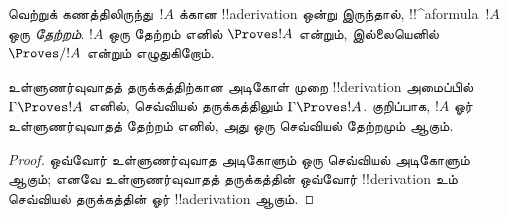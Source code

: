 \documentclass[../../../include/open-logic-section]{subfiles}
\begin{document}
\begin{defn}[தேற்றங்கள்]
வெற்றுக் கணத்திலிருந்து~$!A$ க்கான !!a{derivation} ஒன்று இருந்தால்,
!!^a{formula}~$!A$ ஒரு \emph{தேற்றம்}. $!A$ ஒரு தேற்றம் எனில் $\Proves !A$
என்றும், இல்லையெனில் $\Proves/ !A$ என்றும் எழுதுகிறோம்.
\end{defn}

\begin{prop}
  உள்ளுணர்வுவாதத் தருக்கத்திற்கான அடிகோள் முறை !!{derivation} அமைப்பில்
  $\Gamma \Proves !A$ எனில், செவ்வியல் தருக்கத்திலும் $\Gamma \Proves !A$.
  குறிப்பாக, $!A$ ஓர் உள்ளுணர்வுவாதத் தேற்றம் எனில், அது ஒரு செவ்வியல்
  தேற்றமும் ஆகும்.
\end{prop}

\begin{proof}
  ஒவ்வோர் உள்ளுணர்வுவாத அடிகோளும் ஒரு செவ்வியல் அடிகோளும் ஆகும்; எனவே
  உள்ளுணர்வுவாதத் தருக்கத்தின் ஒவ்வோர் !!{derivation} உம் செவ்வியல்
  தருக்கத்தின் ஓர் !!a{derivation} ஆகும்.
\end{proof}
\end{document}
